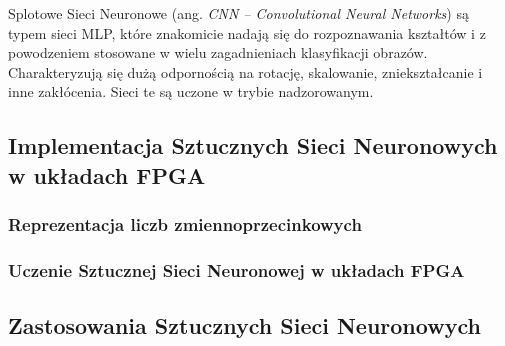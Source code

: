 Splotowe Sieci Neuronowe (ang. \emph{CNN -- Convolutional Neural Networks}) są typem sieci MLP, które znakomicie nadają się do rozpoznawania kształtów i z powodzeniem stosowane w wielu zagadnieniach klasyfikacji obrazów. Charakteryzują się dużą odpornością na rotację, skalowanie, zniekształcanie i inne zakłócenia\cite{haykin2009neural}. Sieci te są uczone w trybie nadzorowanym.

\subsection{Implementacja Sztucznych Sieci Neuronowych w układach FPGA}
\subsubsection{Reprezentacja liczb zmiennoprzecinkowych}
\subsubsection{Uczenie Sztucznej Sieci Neuronowej w układach FPGA}
\subsection{Zastosowania Sztucznych Sieci Neuronowych}

